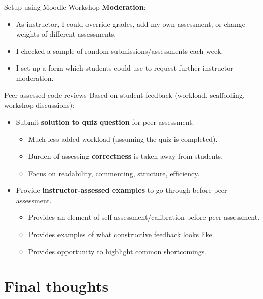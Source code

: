 \documentclass[aspectratio=169, 12pt]{beamer}
\begin{document}
\begin{frame}{Setup using Moodle Workshop}
    \textbf{Moderation}:
    \begin{itemize}
        \item As instructor, I could override grades, add my own assessment, or change weights of different assessments.
        \item I checked a sample of random submissions/assessments each week.
        \item I set up a form which students could use to request further instructor moderation.
    \end{itemize}
\end{frame}



\begin{frame}{Peer-assessed code reviews}
    Based on student feedback (workload, scaffolding, workshop discussions):
    \begin{itemize}
        \item Submit \textbf{solution to quiz question} for peer-assessment.
            \begin{itemize}
                \item Much less added workload (assuming the quiz is completed).
                \item Burden of assessing \textbf{correctness} is taken away from students.
                \item Focus on readability, commenting, structure, efficiency.
            \end{itemize}
        \item Provide \textbf{instructor-assessed examples} to go through before peer assessment.
            \begin{itemize}
                \item Provides an element of self-assessment/calibration before peer assessment.
                \item Provides examples of what constructive feedback looks like.
                \item Provides opportunity to highlight common shortcomings.
            \end{itemize}
    \end{itemize}
\end{frame}

\section{Final thoughts}
\end{document}
